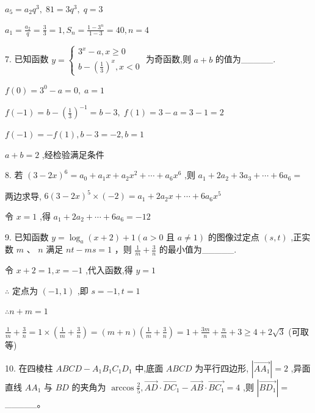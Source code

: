 \documentclass[10pt]{article}
\begin{document}
\({a}_{5} = {a}_{2}{q}^{3},\;{81} = 3{q}^{3},\;q = 3\)

\({a}_{1} = \frac{{a}_{2}}{q} = \frac{3}{3} = 1,{S}_{n} = \frac{1 - {3}^{n}}{1 - 3} = {40},n = 4\)

7. 已知函数 \(y = \left\{  \begin{array}{l} {3}^{x} - a,x \geq  0 \\  b - {\left( \frac{1}{3}\right) }^{x},x < 0 \end{array}\right.\) 为奇函数,则 \(a + b\) 的值为\_\_\_\_\_.

\(f\left( 0\right)  = {3}^{0} - a = 0,\;a = 1\)

\(f\left( {-1}\right)  = b - {\left( \frac{1}{3}\right) }^{-1} = b - 3,\;f\left( 1\right)  = 3 - a = 3 - 1 = 2\)

\(f\left( {-1}\right)  =  - f\left( 1\right) ,b - 3 =  - 2,b = 1\)

\(a + b = 2\) ,经检验满足条件

8. 若 \({\left( 3 - 2x\right) }^{6} = {a}_{0} + {a}_{1}x + {a}_{2}{x}^{2} + \cdots  + {a}_{6}{x}^{6}\) ,则 \({a}_{1} + 2{a}_{2} + 3{a}_{3} + \cdots  + 6{a}_{6} =\)

两边求导, \(6{\left( 3 - 2x\right) }^{5} \times  \left( {-2}\right)  = {a}_{1} + 2{a}_{2}x + \cdots  + 6{a}_{6}{x}^{5}\)

令 \(x = 1\) ,得 \({a}_{1} + 2{a}_{2} + \cdots  + 6{a}_{6} =  - {12}\)

9. 已知函数 \(y = {\log }_{a}\left( {x + 2}\right)  + 1\left( {a > 0}\right.\) 且 \(\left. {a \neq  1}\right)\) 的图像过定点 \(\left( {s,t}\right)\) ,正实数 \(m\text{ 、 }n\) 满足 \({nt} - {ms} = 1\) ，则 \(\frac{1}{m} + \frac{3}{n}\) 的最小值为\_\_\_\_\_.

令 \(x + 2 = 1,x =  - 1\) ,代入函数,得 \(y = 1\)

\(\therefore\) 定点为 \(\left( {-1,1}\right)\) ,即 \(s =  - 1,t = 1\)

\(\therefore n + m = 1\)

\(\frac{1}{m} + \frac{3}{n} = 1 \times  \left( {\frac{1}{m} + \frac{3}{n}}\right)  = \left( {m + n}\right) \left( {\frac{1}{m} + \frac{3}{n}}\right)  = 1 + \frac{3m}{n} + \frac{n}{m} + 3 \geq  4 + 2\sqrt{3}\) (可取等)

10. 在四棱柱 \({ABCD} - {A}_{1}{B}_{1}{C}_{1}{D}_{1}\) 中,底面 \({ABCD}\) 为平行四边形, \(\left| \overrightarrow{A{A}_{1}}\right|  = 2\) ,异面直线 \(A{A}_{1}\) 与 \({BD}\) 的夹角为 \(\arccos \frac{2}{5},\overrightarrow{AD} \cdot  \overrightarrow{D{C}_{1}} - \overrightarrow{AB} \cdot  \overrightarrow{B{C}_{1}} = 4\) ,则 \(\left| \overrightarrow{B{D}_{1}}\right|  =\) \_\_\_\_\_。
\end{document}
